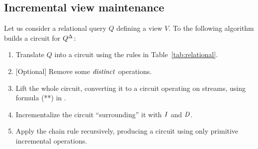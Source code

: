 %

\subsection{Incremental view maintenance}

Let us consider a relational query $Q$ defining a view $V$.  To the
following algorithm builds a \dbsp circuit for ${Q}^{\Delta}$:
%
\begin{algorithm}\label{algorithm-inc}\!
  \vspace{-3mm}
\begin{enumerate}[nosep, leftmargin=0pt, itemindent=0.5cm, label=\textbf{(\arabic{*})}]
\item Translate $Q$ into a circuit using the rules in Table~\ref{tab:relational}.
\item{} [Optional] Remove some $\mathit{distinct}$ operations.
\item Lift the whole circuit, converting it to a circuit operating
  on streams, using formula (**) in .
\item Incrementalize the circuit ``surrounding'' it with $\mathit{I}$ and $\mathit{D}$.
\item Apply the chain rule recursively, producing a circuit using only
  primitive incremental operations.
\end{enumerate}
\end{algorithm}

